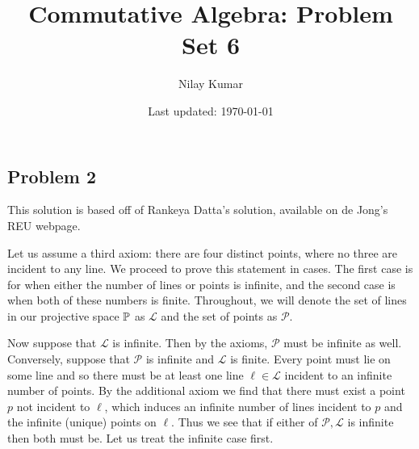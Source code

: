 \documentclass{../../mathnotes}
\title{Commutative Algebra: Problem Set 6}
\author{Nilay Kumar}
\date{Last updated: \today}
\begin{document}
\maketitle

\subsection*{Problem 2}

This solution is based off of Rankeya Datta's solution, available on de Jong's REU webpage.

Let us assume a third axiom: there are four distinct points, where no three are incident to any line.
We proceed to prove this statement in cases. The first case is for when either the number of lines or points is infinite,
and the second case is when both of these numbers is finite. Throughout, we will denote the set of lines in our projective space $\mathbb{P}$
as $\mathcal{L}$ and the set of points as $\mathcal{P}$.

Now suppose that $\mathcal{L}$ is infinite. Then by the axioms, $\mathcal{P}$ must be infinite as well. Conversely, suppose that $\mathcal{P}$ is
infinite and $\mathcal{L}$ is finite. Every point must lie on some line and so there must be at least one line $\ell\in\mathcal{L}$ incident to
an infinite number of points. By the additional axiom we find that there must exist a point $p$ not incident to $\ell$, which induces
an infinite number of lines incident to $p$ and the infinite (unique) points on $\ell$. Thus we see that if either of $\mathcal{P},\mathcal{L}$ is infinite
then both must be. Let us treat the infinite case first.
\end{document}
